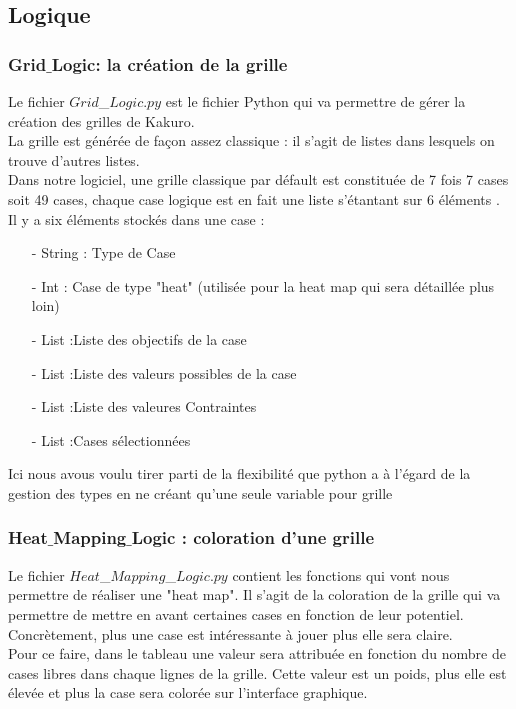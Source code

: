 \documentclass[french,12pt]{article}
\begin{document}
 
\subsection{Logique}
\subsubsection{Grid$\_$Logic: la création de la grille}
Le fichier $Grid$\_$Logic.py$ est le fichier Python qui va permettre de gérer la création des grilles de Kakuro. \\ La grille est générée de façon assez classique : il s'agit de listes dans lesquels on trouve d'autres listes. \\
Dans notre logiciel, une grille classique par défault est constituée de 7 fois 7 cases soit 49 cases, chaque case logique est en fait une liste s'étantant sur 6 éléments . \\

\newpage
Il y a six éléments stockés dans une case : \\
\begin{enumerate}
\item[-] String : Type de Case
\item[-] Int : Case de type "heat" (utilisée pour la heat map qui sera détaillée plus loin)
\item[-] List :Liste des objectifs de la case
\item[-] List :Liste des valeurs possibles de la case
\item[-] List :Liste des valeures Contraintes
\item[-] List :Cases sélectionnées
\end{enumerate}
Ici nous avous voulu tirer parti de la flexibilité que python a à l'égard de la gestion des types en ne créant qu'une seule variable pour grille

\subsubsection{Heat$\_$Mapping$\_$Logic : coloration d'une grille}

Le fichier $Heat$\_$Mapping$\_$Logic.py$ contient les fonctions qui vont nous permettre de réaliser une "heat map". Il s'agit de la coloration de la grille qui va permettre de mettre en avant certaines cases en fonction de leur potentiel. Concrètement, plus une case est intéressante à jouer plus elle sera claire. \\
Pour ce faire, dans le tableau une valeur sera attribuée en fonction du nombre de cases libres dans chaque lignes de la grille. Cette valeur est un poids, plus elle est élevée et plus la case sera colorée sur l'interface graphique.  \\ \\
\end{document}
